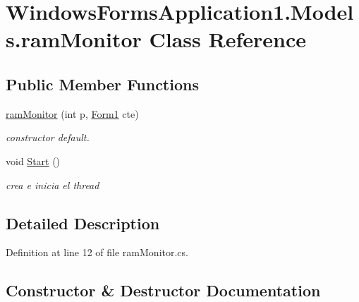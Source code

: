 \hypertarget{class_windows_forms_application1_1_1_models_1_1ram_monitor}{}\section{Windows\+Forms\+Application1.\+Models.\+ram\+Monitor Class Reference}
\label{class_windows_forms_application1_1_1_models_1_1ram_monitor}
\subsection*{Public Member Functions}
\begin{DoxyCompactItemize}
\item 
\hyperlink{class_windows_forms_application1_1_1_models_1_1ram_monitor_ad5a55b438a2b36335689d27cc9661b36}{ram\+Monitor} (int p, \hyperlink{class_windows_forms_application1_1_1_form1}{Form1} cte)
\begin{DoxyCompactList}\small\item\em constructor default. \end{DoxyCompactList}\item 
void \hyperlink{class_windows_forms_application1_1_1_models_1_1ram_monitor_aa7fa3d4e01ea1db3c2f8dd355d7ed3e0}{Start} ()
\begin{DoxyCompactList}\small\item\em crea e inicia el thread \end{DoxyCompactList}\end{DoxyCompactItemize}


\subsection{Detailed Description}


Definition at line 12 of file ram\+Monitor.\+cs.



\subsection{Constructor \& Destructor Documentation}
\hypertarget{class_windows_forms_application1_1_1_models_1_1ram_monitor_ad5a55b438a2b36335689d27cc9661b36}{}

